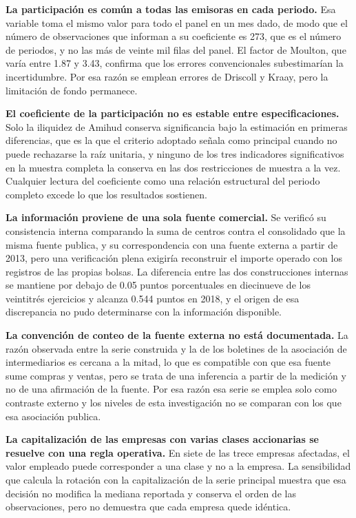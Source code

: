 \textbf{La participación es común a todas las emisoras en cada periodo.} Esa variable toma el mismo valor para todo el panel en un mes dado, de modo que el número de observaciones que informan a su coeficiente es 273, que es el número de periodos, y no las más de veinte mil filas del panel. El factor de Moulton, que varía entre 1.87 y 3.43, confirma que los errores convencionales subestimarían la incertidumbre. Por esa razón se emplean errores de Driscoll y Kraay, pero la limitación de fondo permanece.

\textbf{El coeficiente de la participación no es estable entre especificaciones.} Solo la iliquidez de Amihud conserva significancia bajo la estimación en primeras diferencias, que es la que el criterio adoptado señala como principal cuando no puede rechazarse la raíz unitaria, y ninguno de los tres indicadores significativos en la muestra completa la conserva en las dos restricciones de muestra a la vez. Cualquier lectura del coeficiente como una relación estructural del periodo completo excede lo que los resultados sostienen.

\textbf{La información proviene de una sola fuente comercial.} Se verificó su consistencia interna comparando la suma de centros contra el consolidado que la misma fuente publica, y su correspondencia con una fuente externa a partir de 2013, pero una verificación plena exigiría reconstruir el importe operado con los registros de las propias bolsas. La diferencia entre las dos construcciones internas se mantiene por debajo de 0.05 puntos porcentuales en diecinueve de los veintitrés ejercicios y alcanza 0.544 puntos en 2018, y el origen de esa discrepancia no pudo determinarse con la información disponible.

\textbf{La convención de conteo de la fuente externa no está documentada.} La razón observada entre la serie construida y la de los boletines de la asociación de intermediarios es cercana a la mitad, lo que es compatible con que esa fuente sume compras y ventas, pero se trata de una inferencia a partir de la medición y no de una afirmación de la fuente. Por esa razón esa serie se emplea solo como contraste externo y los niveles de esta investigación no se comparan con los que esa asociación publica.

\textbf{La capitalización de las empresas con varias clases accionarias se resuelve con una regla operativa.} En siete de las trece empresas afectadas, el valor empleado puede corresponder a una clase y no a la empresa. La sensibilidad que calcula la rotación con la capitalización de la serie principal muestra que esa decisión no modifica la mediana reportada y conserva el orden de las observaciones, pero no demuestra que cada empresa quede idéntica.

